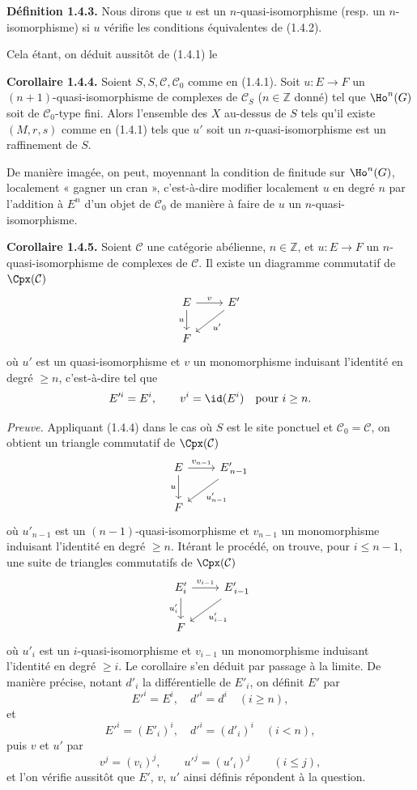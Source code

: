 \documentclass[11pt]{article}
\begin{document}
\textbf{Définition 1.4.3.} Nous dirons que \(u\) est un \(n\)-quasi-isomorphisme (resp. un \(n\)-isomorphisme) si \(u\) vérifie les conditions équivalentes de (1.4.2).

Cela étant, on déduit aussitôt de (1.4.1) le

\textbf{Corollaire 1.4.4.} Soient \(S,S,\mathcal C,\mathcal C_0\) comme en (1.4.1). Soit \(u:E\to F\) un \((n+1)\)-quasi-isomorphisme de complexes de \(\mathcal C_S\) (\(n\in\mathbb Z\) donné) tel que \(\Ho^n(G)\) soit de \(\mathcal C_0\)-type fini. Alors l'ensemble des \(X\) au-dessus de \(S\) tels qu'il existe \((M,r,s)\) comme en (1.4.1) tels que \(u'\) soit un \(n\)-quasi-isomorphisme est un raffinement de \(S\).

De manière imagée, on peut, moyennant la condition de finitude sur \(\Ho^n(G)\), localement « gagner un cran », c'est-à-dire modifier localement \(u\) en degré \(n\) par l'addition à \(E^n\) d'un objet de \(\mathcal C_0\) de manière à faire de \(u\) un \(n\)-quasi-isomorphisme.

\textbf{Corollaire 1.4.5.} Soient \(\mathcal C\) une catégorie abélienne, \(n\in\mathbb Z\), et \(u:E\to F\) un \(n\)-quasi-isomorphisme de complexes de \(\mathcal C\). Il existe un diagramme commutatif de \(\Cpx(\mathcal C)\)
\[
\begin{tikzcd}
E \arrow[r,"v"] \arrow[d,"u"'] & E' \arrow[dl,"u'"]\\
F &
\end{tikzcd}
\]
où \(u'\) est un quasi-isomorphisme et \(v\) un monomorphisme induisant l'identité en degré \(\geq n\), c'est-à-dire tel que
\[
  E'^i=E^i,\qquad v^i=\id(E^i)\quad\text{pour }i\geq n.
\]

\emph{Preuve.} Appliquant (1.4.4) dans le cas où \(S\) est le site ponctuel et \(\mathcal C_0=\mathcal C\), on obtient un triangle commutatif de \(\Cpx(\mathcal C)\)
\[
\begin{tikzcd}
E \arrow[r,"v_{n-1}"] \arrow[d,"u"'] & E'_{\,n-1} \arrow[dl,"u'_{n-1}"]\\
F &
\end{tikzcd}
\]
où \(u'_{n-1}\) est un \((n-1)\)-quasi-isomorphisme et \(v_{n-1}\) un monomorphisme induisant l'identité en degré \(\geq n\). Itérant le procédé, on trouve, pour \(i\leq n-1\), une suite de triangles commutatifs de \(\Cpx(\mathcal C)\)
\[
\begin{tikzcd}
E'_i \arrow[r,"v_{i-1}"] \arrow[d,"u'_i"'] & E'_{\,i-1} \arrow[dl,"u'_{i-1}"]\\
F &
\end{tikzcd}
\]
où \(u'_i\) est un \(i\)-quasi-isomorphisme et \(v_{i-1}\) un monomorphisme induisant l'identité en degré \(\geq i\). Le corollaire s'en déduit par passage à la limite. De manière précise, notant \(d'_i\) la différentielle de \(E'_i\), on définit \(E'\) par
\[
  E'^i=E^i,\quad d'^i=d^i\quad (i\geq n),
\]
et
\[
  E'^i=(E'_i)^i,\quad d'^i=(d'_i)^i\quad (i<n),
\]
puis \(v\) et \(u'\) par
\[
  v^j=(v_i)^j,\qquad u'^j=(u'_i)^j\qquad (i\leq j),
\]
et l'on vérifie aussitôt que \(E'\), \(v\), \(u'\) ainsi définis répondent à la question.
\end{document}
